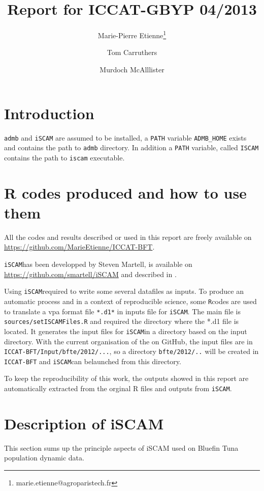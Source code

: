 \documentclass[a4paper]{article}\usepackage{graphicx, color}
\title{Report for ICCAT-GBYP 04/2013}
\author[1]{Marie-Pierre Etienne\thanks{marie.etienne@agroparistech.fr}}
\author[2]{Tom Carruthers }
\author[2]{Murdoch McAlllister}
\affil[1]{AgroParisTech}
\affil[2]{UBC}
\newcommand{\rcode}{\texttt{R}}
\newcommand{\iscam}{\texttt{iSCAM}}
\begin{document}
\graphicspath{{/home/metienne/ICCAT/ICCAT-BFT/Report/}}
 






\maketitle
\section{Introduction}
\verb+admb+ and \verb+iSCAM+ are assumed to be installed, a \verb+PATH+ variable \verb+ADMB_HOME+ exists and contains the path to \verb+admb+ directory. In addition a \verb+PATH+ variable, called \verb+ISCAM+ contains the path to \verb+iscam+ executable.   
\section{R codes produced and how to use them}
All the codes and results described  or used in this report are freely
available on \url{https://github.com/MarieEtienne/ICCAT-BFT}. 

\iscam  has  been  developped  by  Steven  Martell,  is  available  on
\url{https://github.com/smartell/iSCAM} and described in \cite{Martell11}.

Using \iscam  required to write  some several datafiles as  inputs. To
produce an automatic process and in a context of reproducible science,
some \rcode codes  are used to translate a vpa  format file \verb+*.d1*+ in
inputs     file      for     \iscam.     The     main      file     is
\verb+sources/setISCAMFiles.R+  and required  the directory  where the
*.d1 file  is located. It  generates the input  files for \iscam  in a
directory based on the input  directory. With the current organisation
of the on GitHub, the input files are in \verb+ICCAT-BFT/Input/bfte/2012/...+, so
a directory  \verb+bfte/2012/..+ will  be created  in \verb+ICCAT-BFT+
and \iscam can belaunched from this directory.


To keep  the reproducibility of  this work,  the outputs showed  in this
report  are  automatically extracted  from  the  orginal R  files  and
outputs from \iscam.




\section{Description of iSCAM}
This section  sums up the principle  aspects of iSCAM used  on Bluefin
Tuna population dynamic data.
\end{document}
